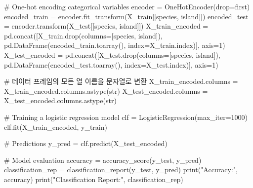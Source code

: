 \documentclass[
  letterpaper,
  chapter,a4paper,showtrims,openright,hidelinks]{oblivoir}
\newenvironment{Shaded}{\begin{snugshade}}{\end{snugshade}}
\newcommand{\BuiltInTok}[1]{\textcolor[rgb]{0.00,0.23,0.31}{#1}}
\newcommand{\CommentTok}[1]{\textcolor[rgb]{0.37,0.37,0.37}{#1}}
\newcommand{\DecValTok}[1]{\textcolor[rgb]{0.68,0.00,0.00}{#1}}
\newcommand{\NormalTok}[1]{\textcolor[rgb]{0.00,0.23,0.31}{#1}}
\newcommand{\OperatorTok}[1]{\textcolor[rgb]{0.37,0.37,0.37}{#1}}
\newcommand{\StringTok}[1]{\textcolor[rgb]{0.13,0.47,0.30}{#1}}
\begin{document}
\begin{Shaded}
\begin{Highlighting}[]
\CommentTok{\# One{-}hot encoding categorical variables}
\NormalTok{encoder }\OperatorTok{=}\NormalTok{ OneHotEncoder(drop}\OperatorTok{=}\StringTok{\textquotesingle{}first\textquotesingle{}}\NormalTok{)}
\NormalTok{encoded\_train }\OperatorTok{=}\NormalTok{ encoder.fit\_transform(X\_train[[}\StringTok{\textquotesingle{}species\textquotesingle{}}\NormalTok{, }\StringTok{\textquotesingle{}island\textquotesingle{}}\NormalTok{]])}
\NormalTok{encoded\_test }\OperatorTok{=}\NormalTok{ encoder.transform(X\_test[[}\StringTok{\textquotesingle{}species\textquotesingle{}}\NormalTok{, }\StringTok{\textquotesingle{}island\textquotesingle{}}\NormalTok{]])}
\NormalTok{X\_train\_encoded }\OperatorTok{=}\NormalTok{ pd.concat([X\_train.drop(columns}\OperatorTok{=}\NormalTok{[}\StringTok{\textquotesingle{}species\textquotesingle{}}\NormalTok{, }\StringTok{\textquotesingle{}island\textquotesingle{}}\NormalTok{]), pd.DataFrame(encoded\_train.toarray(), index}\OperatorTok{=}\NormalTok{X\_train.index)], axis}\OperatorTok{=}\DecValTok{1}\NormalTok{)}
\NormalTok{X\_test\_encoded }\OperatorTok{=}\NormalTok{ pd.concat([X\_test.drop(columns}\OperatorTok{=}\NormalTok{[}\StringTok{\textquotesingle{}species\textquotesingle{}}\NormalTok{, }\StringTok{\textquotesingle{}island\textquotesingle{}}\NormalTok{]), pd.DataFrame(encoded\_test.toarray(), index}\OperatorTok{=}\NormalTok{X\_test.index)], axis}\OperatorTok{=}\DecValTok{1}\NormalTok{)}

\CommentTok{\# 데이터 프레임의 모든 열 이름을 문자열로 변환}
\NormalTok{X\_train\_encoded.columns }\OperatorTok{=}\NormalTok{ X\_train\_encoded.columns.astype(}\BuiltInTok{str}\NormalTok{)}
\NormalTok{X\_test\_encoded.columns }\OperatorTok{=}\NormalTok{ X\_test\_encoded.columns.astype(}\BuiltInTok{str}\NormalTok{)}


\CommentTok{\# Training a logistic regression model}
\NormalTok{clf }\OperatorTok{=}\NormalTok{ LogisticRegression(max\_iter}\OperatorTok{=}\DecValTok{1000}\NormalTok{)}
\NormalTok{clf.fit(X\_train\_encoded, y\_train)}

\CommentTok{\# Predictions}
\NormalTok{y\_pred }\OperatorTok{=}\NormalTok{ clf.predict(X\_test\_encoded)}

\CommentTok{\# Model evaluation}
\NormalTok{accuracy }\OperatorTok{=}\NormalTok{ accuracy\_score(y\_test, y\_pred)}
\NormalTok{classification\_rep }\OperatorTok{=}\NormalTok{ classification\_report(y\_test, y\_pred)}
\BuiltInTok{print}\NormalTok{(}\StringTok{"Accuracy:"}\NormalTok{, accuracy)}
\BuiltInTok{print}\NormalTok{(}\StringTok{"Classification Report:"}\NormalTok{, classification\_rep)}
\end{Highlighting}
\end{Shaded}
\end{document}
